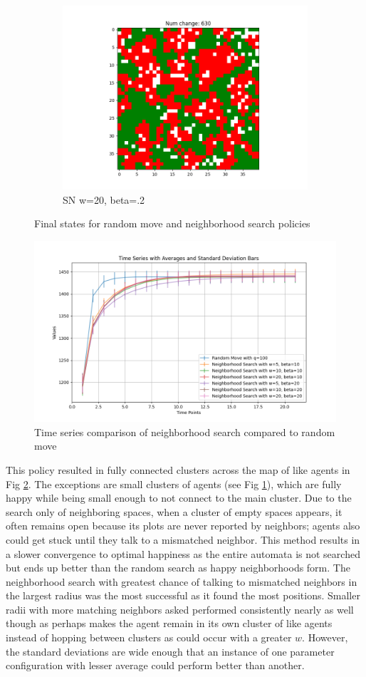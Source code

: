 \documentclass[11pt]{article}
\begin{document}
\begin{figure}[h]
\begin{subfigure}{0.14\textwidth}
			\includegraphics[width=\linewidth]{final_cluster_w20b20.png}
			\caption{\centering SN w=20, beta=.2}
			\label{sn_finalw20b20}
		\end{subfigure}
		\caption{Final states for random move and neighborhood search policies}
		\label{sn_finalstate}
	\end{figure}
	\FloatBarrier
	
	\begin{figure}
		\centering
		\includegraphics[width=.5\textwidth]{policies02.png}
		\caption{Time series comparison of neighborhood search compared to random move}
	\end{figure}
	This policy resulted in fully connected clusters across the map of like agents in Fig \ref{sn_finalstate}. The exceptions are small clusters of agents (see Fig \ref{sn_finalw20b20}), which are fully happy while being small enough to not connect to the main cluster. Due to the search only of neighboring spaces, when a cluster of empty spaces appears, it often remains open because its plots are never reported by neighbors; agents also could get stuck until they talk to a mismatched neighbor. This method results in a slower convergence to optimal happiness as the entire automata is not searched but ends up better than the random search as happy neighborhoods form. The neighborhood search with greatest chance of talking to mismatched neighbors in the largest radius was the most successful as it found the most positions. Smaller radii with more matching neighbors asked performed consistently nearly as well though as perhaps makes the agent remain in its own cluster of like agents instead of hopping between  clusters as could occur with a greater $w$. However, the standard deviations are wide enough that an instance of one parameter configuration with lesser average could perform better than another.
	
\end{document}
